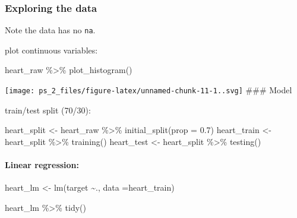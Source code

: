 \documentclass[
]{article}
\newenvironment{Shaded}{\begin{snugshade}}{\end{snugshade}}
\newcommand{\AttributeTok}[1]{\textcolor[rgb]{0.77,0.63,0.00}{#1}}
\newcommand{\FloatTok}[1]{\textcolor[rgb]{0.00,0.00,0.81}{#1}}
\newcommand{\FunctionTok}[1]{\textcolor[rgb]{0.00,0.00,0.00}{#1}}
\newcommand{\NormalTok}[1]{#1}
\newcommand{\OtherTok}[1]{\textcolor[rgb]{0.56,0.35,0.01}{#1}}
\newcommand{\SpecialCharTok}[1]{\textcolor[rgb]{0.00,0.00,0.00}{#1}}
\begin{document}
\hypertarget{exploring-the-data-1}{%
\subsubsection{Exploring the data}\label{exploring-the-data-1}}

Note the data has no \texttt{na}.

plot continuous variables:

\begin{Shaded}
\begin{Highlighting}[]
\NormalTok{heart\_raw }\SpecialCharTok{\%\textgreater{}\%} 
  \FunctionTok{plot\_histogram}\NormalTok{()}
\end{Highlighting}
\end{Shaded}

\texttt{[image: ps\_2\_files/figure-latex/unnamed-chunk-11-1..svg]} \#\#\#
Model

train/test split (70/30):

\begin{Shaded}
\begin{Highlighting}[]
\NormalTok{heart\_split }\OtherTok{\textless{}{-}}\NormalTok{ heart\_raw }\SpecialCharTok{\%\textgreater{}\%} \FunctionTok{initial\_split}\NormalTok{(}\AttributeTok{prop =} \FloatTok{0.7}\NormalTok{)}
\NormalTok{heart\_train }\OtherTok{\textless{}{-}}\NormalTok{ heart\_split }\SpecialCharTok{\%\textgreater{}\%} \FunctionTok{training}\NormalTok{()}
\NormalTok{heart\_test }\OtherTok{\textless{}{-}}\NormalTok{ heart\_split }\SpecialCharTok{\%\textgreater{}\%} \FunctionTok{testing}\NormalTok{()}
\end{Highlighting}
\end{Shaded}

\hypertarget{linear-regression-1}{%
\paragraph{Linear regression:}\label{linear-regression-1}}

\begin{Shaded}
\begin{Highlighting}[]
\NormalTok{heart\_lm }\OtherTok{\textless{}{-}}  \FunctionTok{lm}\NormalTok{(target }\SpecialCharTok{\textasciitilde{}}\NormalTok{.,}
                \AttributeTok{data =}\NormalTok{heart\_train)}

\NormalTok{heart\_lm }\SpecialCharTok{\%\textgreater{}\%} \FunctionTok{tidy}\NormalTok{()}
\end{Highlighting}
\end{Shaded}
\end{document}
